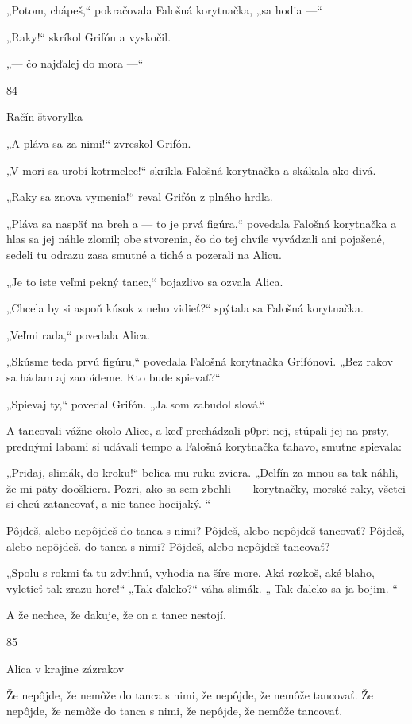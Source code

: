 \documentclass[12pt]{article}
\begin{document}
\begin{Parallel}[p]{}{}
{{„Potom, chápeš,“ pokračovala Falošná korytnačka, „sa
hodia —“

„Raky!“ skríkol Grifón a vyskočil.

„— čo najďalej do mora —“

84

 

Račín štvorylka

„A pláva sa za nimi!“ zvreskol Grifón.

„V mori sa urobí kotrmelec!“ skríkla Falošná korytnačka
a skákala ako divá.

„Raky sa znova vymenia!“ reval Grifón z plného hrdla.

„Pláva sa naspäť na breh a — to je prvá figúra,“ povedala
Falošná korytnačka a hlas sa jej náhle zlomil; obe stvorenia,
čo do tej chvíle vyvádzali ani pojašené, sedeli tu odrazu
zasa smutné a tiché a pozerali na Alicu.

„Je to iste veľmi pekný tanec,“ bojazlivo sa ozvala
Alica.

„Chcela by si aspoň kúsok z neho vidieť?“ spýtala sa
Falošná korytnačka.

„Veľmi rada,“ povedala Alica.

„Skúsme teda prvú figúru,“ povedala Falošná korytnačka
Grifónovi. „Bez rakov sa hádam aj zaobídeme. Kto bude
spievať?“

„Spievaj ty,“ povedal Grifón. „Ja som zabudol slová.“

A tancovali vážne okolo Alice, a keď prechádzali p0pri
nej, stúpali jej na prsty, prednými labami si udávali tempo
a Falošná korytnačka ťahavo, smutne spievala:

„Pridaj, slimák, do kroku!“ belica mu ruku zviera.
„Delfín za mnou sa tak náhli, že mi päty dooškiera.
Pozri, ako sa sem zbehli —- korytnačky, morské raky,
všetci si chcú zatancovať, a nie tanec hocijaký. “

Pôjdeš, alebo nepôjdeš do tanca s nimi?
Pôjdeš, alebo nepôjdeš tancovať?
Pôjdeš, alebo nepôjdeš. do tanca s nimi?
Pôjdeš, alebo nepôjdeš tancovať?

„Spolu s rokmi ťa tu zdvihnú, vyhodia na šíre more.
Aká rozkoš, aké blaho, vyletieť tak zrazu hore!“
„Tak ďaleko?“ váha slimák. „ Tak ďaleko sa ja bojim. “

A že nechce, že ďakuje, že on a tanec nestojí.

85

 

Alica v krajine zázrakov

Že nepôjde, že nemôže do tanca s nimi,
že nepôjde, že nemôže tancovať.
Že nepôjde, že nemôže do tanca s nimi,
že nepôjde, že nemôže tancovať.

}}
\end{Parallel}
\end{document}
